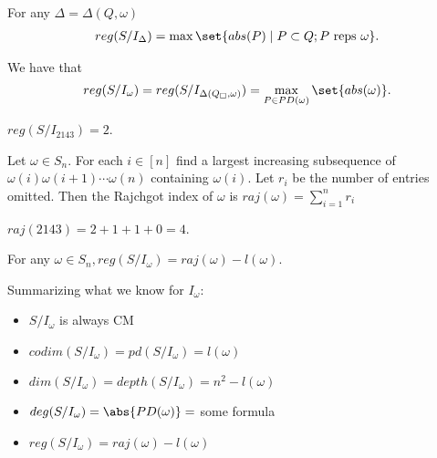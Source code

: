 \begin{corollary}
    For any $\Delta = \Delta ( Q , \omega)$
    \begin{align*}
        reg(S/ I_\Delta) = \max \set{ abs(P) \mid P \subset Q;  P \text{ reps } \omega}.
    \end{align*}
\end{corollary}

\begin{corollary}
    We have that
    \begin{align*}
        reg(S / I_\omega) = reg(S/ I_{\Delta (Q_\square , \omega) }) = \max_{P \in PD(\omega) } \set{abs(\omega) }.
    \end{align*}
\end{corollary}

\begin{example}
    $reg(S / I_{2143}) = 2$.
\end{example}

\begin{definition}
    Let $\omega \in S_n$. For each $i \in [n]$ find a largest increasing subsequence of $\omega ( i ) \omega( i + 1) \cdots \omega (n)$ containing $\omega (i)$. Let $r_i$ be the number of entries omitted. Then the Rajchgot index of $\omega$ is $raj(\omega ) = \sum_{i=1}^n r_i$
\end{definition}

\begin{example}
    $raj(2143) = 2 + 1 + 1 + 0 = 4$.
\end{example}

\begin{theorem}
    For any $\omega \in S_n, reg(S/ I_\omega ) = raj(\omega ) - l(\omega) $.
\end{theorem}

\begin{remark}
    Summarizing what we know for $I_\omega$:
    \begin{itemize}
        \item $S/I_\omega$ is always CM
        \item $codim (S/I_\omega) = pd (S/I_\omega) = l(\omega)$
        \item $dim (S/I_\omega) = depth (S/I_\omega) = n^2 - l(\omega)$
        \item $deg(S/I_\omega)  = \abs{PD(\omega) } = $ some formula
        \item $reg (S/I_\omega ) = raj (\omega) - l(\omega) $
    \end{itemize}
\end{remark}

